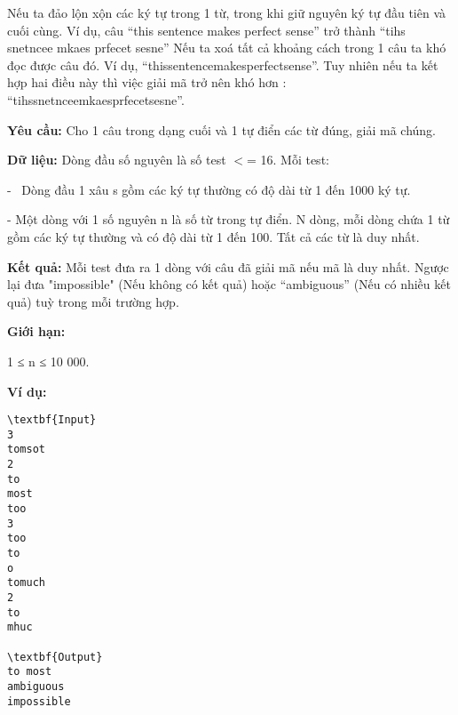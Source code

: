 

Nếu ta đảo lộn xộn các ký tự trong 1 từ, trong khi giữ nguyên ký tự đầu tiên và cuối cùng. Ví dụ, câu “this sentence makes perfect sense” trở thành “tihs snetncee mkaes prfecet sesne” Nếu ta xoá tất cả khoảng cách trong 1 câu ta khó đọc được câu đó. Ví dụ, “thissentencemakesperfectsense”. Tuy nhiên nếu ta kết hợp hai điều này thì việc giải mã trở nên khó hơn : “tihssnetnceemkaesprfecetsesne”.

\textbf{Yêu cầu: } Cho 1 câu trong dạng cuối và 1 tự điển các từ đúng, giải mã chúng.

\textbf{Dữ liệu: } Dòng đầu số nguyên là số test $<$= 16. Mỗi test:

-  Dòng đầu 1 xâu s gồm các ký tự thường có độ dài từ 1 đến 1000 ký tự.

- Một dòng với 1 số nguyên n là số từ trong tự điển. N dòng, mỗi dòng chứa 1 từ gồm các ký tự thường và có độ dài từ 1 đến 100. Tất cả các từ là duy nhất.

\textbf{Kết quả: } Mỗi test đưa ra 1 dòng với câu đã giải mã nếu mã là duy nhất. Ngược lại đưa "impossible" (Nếu không có kết quả) hoặc “ambiguous” (Nếu có nhiều kết quả) tuỳ trong mỗi trường hợp.

\textbf{Giới hạn: }

1 ≤ n ≤ 10 000.

\textbf{Ví dụ: }
\begin{verbatim}
\textbf{Input}
3
tomsot
2
to
most
too
3
too
to
o
tomuch
2
to
mhuc

\textbf{Output}
to most
ambiguous
impossible\end{verbatim}